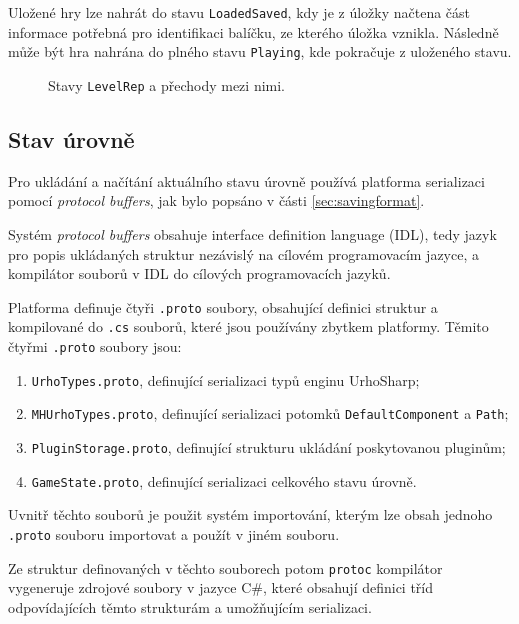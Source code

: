 Uložené hry lze nahrát do stavu \texttt{LoadedSaved}, kdy je z úložky načtena část informace potřebná pro identifikaci balíčku, ze kterého úložka vznikla. Následně může být hra nahrána do plného stavu \texttt{Playing}, kde pokračuje z uloženého stavu.

\begin{figure}[h]
	\centering
	\fontsize{8pt}{11pt}\selectfont
	\def\svgwidth{\textwidth}
	
	\caption{Stavy \texttt{LevelRep} a přechody mezi nimi.}
	\label{fig:levelrepstates}
\end{figure}

\subsection{Stav úrovně}
Pro ukládání a načítání aktuálního stavu úrovně používá platforma serializaci pomocí \textit{protocol buffers}, jak bylo popsáno v části \ref{sec:savingformat}. 

Systém \textit{protocol buffers} obsahuje interface definition language (IDL), tedy jazyk pro popis ukládaných struktur nezávislý na cílovém programovacím jazyce, a kompilátor souborů v IDL do cílových programovacích jazyků. 

Platforma definuje čtyři \texttt{.proto} soubory, obsahující definici struktur a kompilované do \texttt{.cs} souborů, které jsou používány zbytkem platformy. Těmito čtyřmi \texttt{.proto} soubory jsou:

\begin{enumerate}
	\item \texttt{UrhoTypes.proto}, definující serializaci typů enginu UrhoSharp;
	\item \texttt{MHUrhoTypes.proto}, definující serializaci potomků \texttt{DefaultComponent} a \texttt{Path};
	\item \texttt{PluginStorage.proto}, definující strukturu ukládání poskytovanou pluginům;
	\item \texttt{GameState.proto}, definující serializaci celkového stavu úrovně.
\end{enumerate}

Uvnitř těchto souborů je použit systém importování, kterým lze obsah jednoho \texttt{.proto} souboru importovat a použít v jiném souboru. 

Ze struktur definovaných v těchto souborech potom \texttt{protoc} kompilátor vygeneruje zdrojové soubory v jazyce C\#, které obsahují definici tříd odpovídajících těmto strukturám a umožňujícím serializaci.

